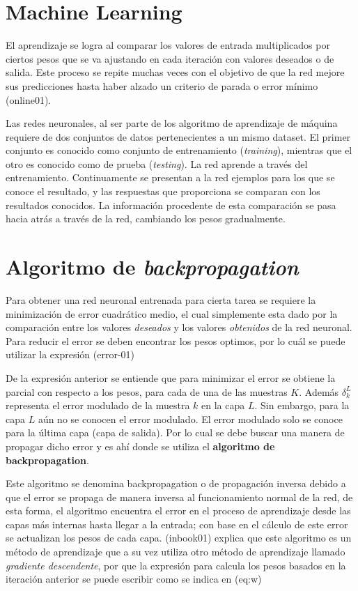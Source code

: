 \documentclass[twocolumn]{article}
\begin{document}
  \twocolumn
  \section{Machine Learning}

  El aprendizaje se logra al comparar los valores de entrada multiplicados por
  ciertos pesos que se va ajustando en cada iteración con valores deseados o de
  salida. Este proceso se repite muchas veces con el objetivo de que la red
  mejore sus predicciones hasta haber alzado un criterio de parada o error
  mínimo (online01).

  Las redes neuronales, al ser parte de los algoritmo de aprendizaje de máquina
  requiere de dos conjuntos de datos pertenecientes a un mismo dataset. El
  primer conjunto es conocido como conjunto de entrenamiento (\textit{training}),
  mientras que el otro es conocido como de prueba (\textit{testing}). La red
  aprende a través del entrenamiento. Continuamente se presentan a la red
  ejemplos para los que se conoce el resultado, y las respuestas que proporciona
  se comparan con los resultados conocidos. La información procedente de esta
  comparación se pasa hacia atrás a través de la red, cambiando los pesos
  gradualmente.

  \section{Algoritmo de \textit{backpropagation}}

  Para obtener una red neuronal entrenada para cierta tarea se requiere la
  minimización de error cuadrático medio, el cual simplemente esta dado por la
  comparación entre los valores \textit{deseados} y los valores
  \textit{obtenidos} de la red neuronal. Para reducir el error se deben
  encontrar los pesos optimos, por lo cuál se puede utilizar la expresión
  (error-01)


  De la expresión anterior se entiende que para minimizar el error se obtiene la
  parcial con respecto a los pesos, para cada de una de las muestras $K$. Además
  $\delta_{k}^{L}$ representa el error modulado de la muestra $k$ en la capa
  $L$.  Sin embargo, para la capa $L$ aún no se conocen el error modulado. El
  error modulado solo se conoce para la última capa (capa de salida). Por lo
  cual se debe buscar una manera de propagar dicho error y es ahí donde se
  utiliza el \textbf{algoritmo de backpropagation}.

  Este algoritmo se denomina backpropagation o de propagación inversa debido a
  que el error se propaga de manera inversa al funcionamiento normal de la red,
  de esta forma, el algoritmo encuentra el error en el proceso de aprendizaje
  desde las capas más internas hasta llegar a la entrada; con base en el cálculo
  de este error se actualizan los pesos de cada capa.
  (inbook01) explica que este algoritmo es un método de aprendizaje que a
  su vez utiliza otro método de aprendizaje llamado \textit{gradiente
  descendente}, por que la expresión para
  calcula los pesos basados en la iteración anterior se puede escribir como se
  indica en (eq:w)
\end{document}
